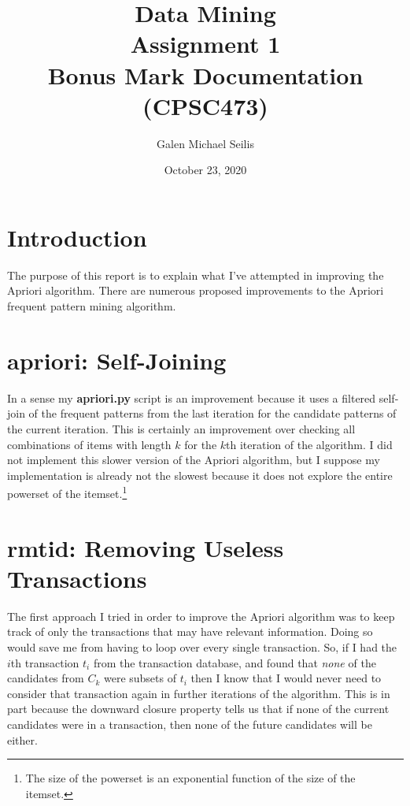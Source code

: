 \documentclass[12 pt]{article}
\title{Data Mining\\Assignment 1\\Bonus Mark Documentation\\(CPSC473)}
\author{Galen Michael Seilis \\}
\date{October 23, 2020}
\begin{document}
\maketitle
\pagebreak

\section{Introduction}
The purpose of this report is to explain what I've attempted in improving the Apriori algorithm. There are numerous proposed improvements to the Apriori frequent pattern mining algorithm.\cite{Park1995, Gu2011, AlMaolegi2014, Yuan2017, Liu2017}

\section{apriori: Self-Joining}

In a sense my \textbf{apriori.py} script is an improvement because it uses a filtered self-join of the frequent patterns from the last iteration for the candidate patterns of the current iteration. This is certainly an improvement over checking all combinations of items with length $k$ for the $k$th iteration of the algorithm. I did not implement this slower version of the Apriori algorithm, but I suppose my implementation is already not the slowest because it does not explore the entire powerset of the itemset.\footnote{The size of the powerset is an exponential function of the size of the itemset.}

\section{rmtid: Removing Useless Transactions}

The first approach I tried in order to improve the Apriori algorithm was to keep track of only the transactions that may have relevant information. Doing so would save me from having to loop over every single transaction. So, if I had the $i$th transaction $t_i$ from the transaction database, and found that \textit{none} of the candidates from $C_k$ were subsets of $t_i$ then I know that I would never need to consider that transaction again in further iterations of the algorithm. This is in part because the downward closure property tells us that if none of the current candidates were in a transaction, then none of the future candidates will be either.\\
\end{document}
